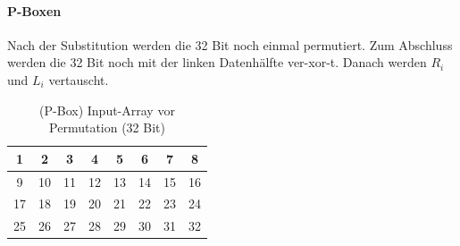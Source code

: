 \paragraph{P-Boxen}

Nach der Substitution werden die 32 Bit noch einmal permutiert. Zum Abschluss werden die 32 Bit noch mit der linken Datenhälfte ver-xor-t. 
Danach werden $R_i$ und $L_i$ vertauscht. 


\begin{table}[h]
    \centering
    \begin{tabular}{|*{8}{c|}}
        \hline
        \cellcolor{red-1}1 & \cellcolor{red-1}2 & \cellcolor{red-1}3 & \cellcolor{red-1}4 & 
        \cellcolor{red-1}5 & \cellcolor{red-1}6 & \cellcolor{red-1}7 & \cellcolor{red-1}8 \\
        \hline 
        \cellcolor{orange-1}9 & \cellcolor{orange-1}10 & \cellcolor{orange-1}11 & \cellcolor{orange-1}12 & 
        \cellcolor{orange-1}13 & \cellcolor{orange-1}14 & \cellcolor{orange-1}15 & \cellcolor{orange-1}16 \\
        \hline 
        \cellcolor{yellow-1}17 & \cellcolor{yellow-1}18 & \cellcolor{yellow-1}19 & \cellcolor{yellow-1}20 & 
        \cellcolor{yellow-1}21 & \cellcolor{yellow-1}22 & \cellcolor{yellow-1}23 & \cellcolor{yellow-1}24 \\
        \hline
        \cellcolor{green-1}25 & \cellcolor{green-1}26 & \cellcolor{green-1}27 & \cellcolor{green-1}28 &
        \cellcolor{green-1}29 & \cellcolor{green-1}30 & \cellcolor{green-1}31 & \cellcolor{green-1}32 \\
        \hline 
    \end{tabular}
    \caption{(P-Box) Input-Array vor Permutation (32 Bit)}
\end{table}

